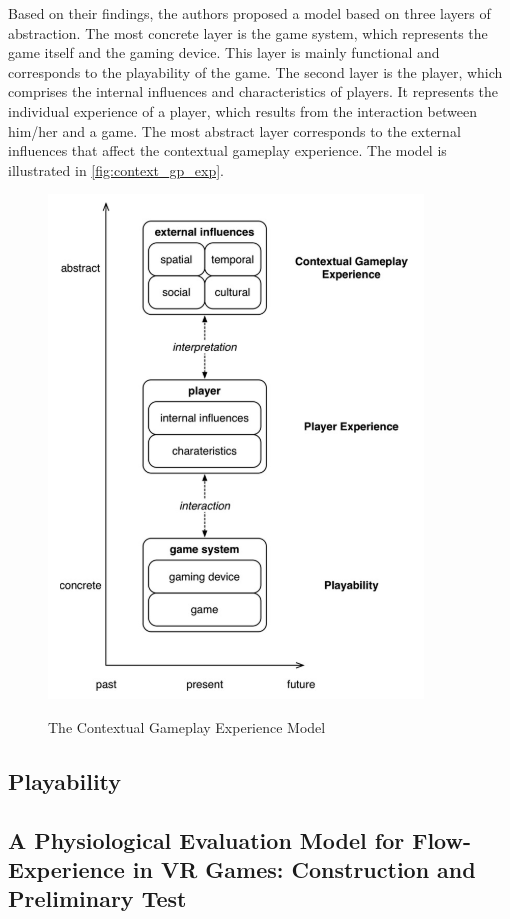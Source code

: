 Based on their findings, the authors proposed a model based on three layers of abstraction. The most concrete layer is the game system, which represents the game itself and the gaming device. This layer is mainly functional and corresponds to the playability of the game. The second layer is the player, which comprises the internal influences and characteristics of players. It represents the individual experience of a player, which results from the interaction between him/her and a game. The most abstract layer corresponds to the external influences that affect the contextual gameplay experience. The model is illustrated in \autoref{fig:context_gp_exp}.

\begin{figure}[bth]
\myfloatalign
{\includegraphics[width=.6\linewidth]{gfx/ref_framework/context_gp_exp}} \quad
\caption[The Contextual Gameplay Experience Model]{The Contextual Gameplay Experience Model \autocite{Engl2013}}\label{fig:context_gp_exp}
\end{figure}

\subsection{Playability}
\label{sec:playability}
\subsection{A Physiological Evaluation Model for Flow-Experience in VR Games: Construction and Preliminary Test}

